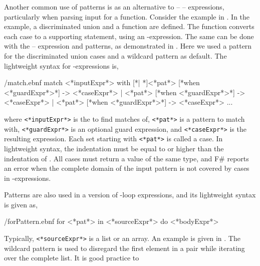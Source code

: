 \documentclass[fsharpNotes.tex]{subfiles}
\begin{document}
Another common use of patterns is as an alternative to  --  --  expressions, particularly when parsing input for a function. Consider the example in .
%
%
In the example, a discriminated union and a function are defined. The function converts each case to a supporting statement, using an -expression. The same can be done with the  --  expression and patterns, as demonstrated in .
%
%
Here we used a pattern for the discriminated union cases and a wildcard pattern as default. The lightweight syntax for -expressions is,
%
\begin{verbatimwrite}{\ebnf/match.ebnf}
match <*inputExpr*> with 
 [*| *]<*pat*> [*when <*guardExpr*>*] -> <*caseExpr*> 
 | <*pat*> [*when <*guardExpr*>*] -> <*caseExpr*> 
 | <*pat*> [*when <*guardExpr*>*] -> <*caseExpr*> 
 ...
\end{verbatimwrite}
%
where \lstinline[language=syntax]{<*inputExpr*>} is the  to find matches of, \lstinline[language=syntax]{<*pat*>} is a pattern to match with, \lstinline[language=syntax]{<*guardExpr*>} is an optional guard expression, and \lstinline[language=syntax]{<*caseExpr*>} is the resulting expression. Each set starting with \lstinline[language=syntax]{<*pat*>} is called a case.  In lightweight syntax, the indentation must be equal to or higher than the indentation of . All cases must return a value of the same type, and F\# reports an error when the complete domain of the input pattern is not covered by cases in -expressions.

Patterns are also used in a version of -loop expressions, and its lightweight syntax is given as,
%
\begin{verbatimwrite}{\ebnf/forPattern.ebnf}
for <*pat*> in <*sourceExpr*> do 
  <*bodyExpr*>
 \end{verbatimwrite}
%
Typically, \lstinline[language=syntax]{<*sourceExpr*>} is a list or an array. An example is given in .
%
%
The wildcard pattern is used to disregard the first element in a pair while iterating over the complete list. It is good practice to 
\end{document}
